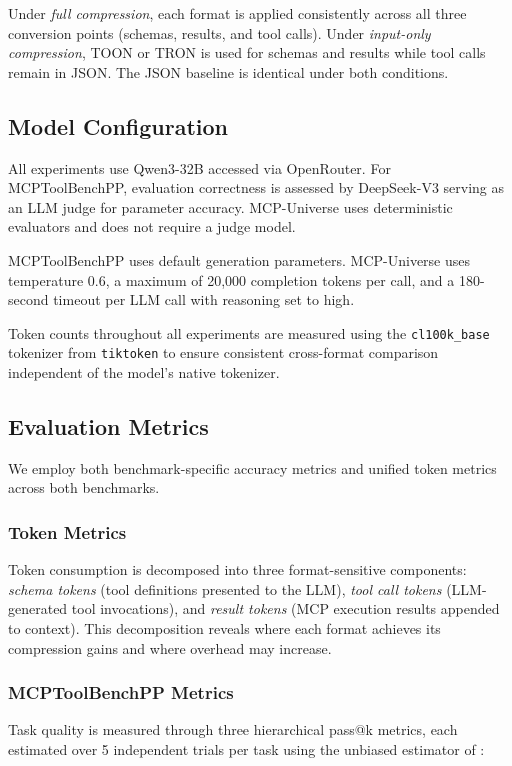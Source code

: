 \documentclass[10pt,twocolumn,letterpaper]{article}
\begin{document}
Under \textit{full compression}, each format is applied consistently across all three conversion points (schemas, results, and tool calls). Under \textit{input-only compression}, TOON or TRON is used for schemas and results while tool calls remain in JSON. The JSON baseline is identical under both conditions.

\subsection{Model Configuration}
\label{sec:model}

All experiments use Qwen3-32B \citep{qwen3_2025} accessed via OpenRouter. For MCPToolBenchPP, evaluation correctness is assessed by DeepSeek-V3 \citep{deepseek_v3_2024} serving as an LLM judge for parameter accuracy. MCP-Universe uses deterministic evaluators and does not require a judge model.

MCPToolBenchPP uses default generation parameters. MCP-Universe uses temperature 0.6, a maximum of 20,000 completion tokens per call, and a 180-second timeout per LLM call with reasoning set to high.

Token counts throughout all experiments are measured using the \texttt{cl100k\_base} tokenizer from \texttt{tiktoken} to ensure consistent cross-format comparison independent of the model's native tokenizer.

\subsection{Evaluation Metrics}
\label{sec:metrics}

We employ both benchmark-specific accuracy metrics and unified token metrics across both benchmarks.

\subsubsection{Token Metrics}
Token consumption is decomposed into three format-sensitive components: \textit{schema tokens} (tool definitions presented to the LLM), \textit{tool call tokens} (LLM-generated tool invocations), and \textit{result tokens} (MCP execution results appended to context). This decomposition reveals where each format achieves its compression gains and where overhead may increase.

\subsubsection{MCPToolBenchPP Metrics}
Task quality is measured through three hierarchical pass@k metrics, each estimated over 5 independent trials per task using the unbiased estimator of \citet{chen2021evaluating}:
\end{document}
